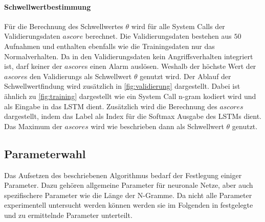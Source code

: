             \paragraph{Schwellwertbestimmung}\label{sec:Schwellung}
                Für die Berechnung des Schwellwertes $\theta$ wird für alle System Calls der Validierungsdaten $ascore$ berechnet.
                Die Validierungsdaten bestehen aus $50$ Aufnahmen und enthalten ebenfalls wie die Trainingsdaten nur das Normalverhalten.
                Da in den Validierungsdaten kein Angriffsverhalten integriert ist, darf keiner der $ascore$s einen Alarm auslösen.
                Weshalb der höchste Wert der $ascore$s den Validierungs als Schwellwert $\theta$ genutzt wird.
                Der Ablauf der Schwellwertfindung wird zusätzlich in \autoref{fig:validierung} dargestellt.
                Dabei ist ähnlich zu \autoref{fig:training} dargestellt wie ein System Call n-gram kodiert wird und als Eingabe in das \ac{LSTM} dient.
                Zusätzlich wird die Berechnung des $ascores$ dargestellt, indem das Label als Index für die Softmax  Ausgabe des \acp{LSTM} dient.
                Das Maximum der $ascores$ wird wie beschrieben dann als Schwellwert $\theta$ genutzt.

        \subsection{Parameterwahl}\label{sec:parameterwahl}
            Das Aufsetzen des beschriebenen Algorithmus bedarf der Festlegung einiger Parameter.
            Dazu gehören allgemeine Parameter für neuronale Netze, aber auch spezifischere Parameter wie die Länge der N-Gramme.
            Da nicht alle Parameter experimentell untersucht werden können werden sie im Folgenden in festgelegte und zu ermittelnde Parameter unterteilt.

